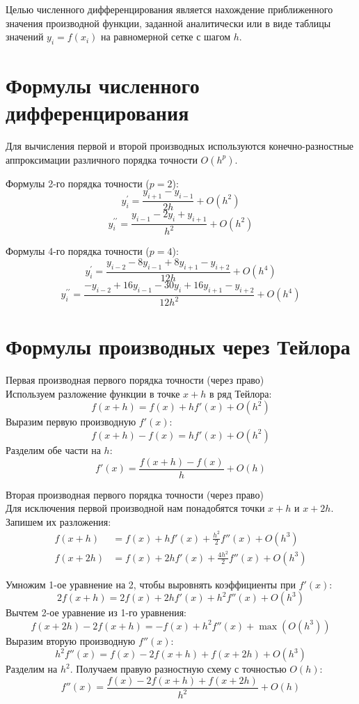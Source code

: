 \documentclass[a4paper]{article}
\begin{document}
Целью численного дифференцирования является нахождение приближенного значения производной функции, заданной аналитически или в виде таблицы значений $y_i = f(x_i)$ на равномерной сетке с шагом $h$.

\section*{\fontsize{11pt}{0pt}\selectfont\textbf{Формулы численного дифференцирования}}

Для вычисления первой и второй производных используются конечно-разностные аппроксимации различного порядка точности $O(h^p)$.

Формулы 2-го порядка точности ($p=2$):
\[
y_{i}^{\prime} = \frac{y_{i+1} - y_{i-1}}{2h} + O(h^2)
\]
\[
y_{i}^{\prime\prime} = \frac{y_{i-1} - 2y_i + y_{i+1}}{h^2} + O(h^2)
\]

Формулы 4-го порядка точности ($p=4$):
\[
y_{i}^{\prime} = \frac{y_{i-2} - 8y_{i-1} + 8y_{i+1} - y_{i+2}}{12h} + O(h^4)
\]
\[
y_{i}^{\prime\prime} = \frac{-y_{i-2} + 16y_{i-1} - 30y_i + 16y_{i+1} - y_{i+2}}{12h^2} + O(h^4)
\]

\section*{\fontsize{11pt}{0pt}\selectfont\textbf{Формулы производных через Тейлора}}

Первая производная первого порядка точности (через право)\\
Используем разложение функции в точке $x+h$ в ряд Тейлора:
\[
f(x+h) = f(x) + hf'(x) + O(h^2)
\]
Выразим первую производную $f'(x)$:
\[
f(x+h) - f(x) = hf'(x) + O(h^2)
\]
Разделим обе части на $h$:
\[
f'(x) = \frac{f(x+h) - f(x)}{h} + O(h)
\]

Вторая производная первого порядка точности (через право)\\
Для исключения первой производной нам понадобятся точки $x+h$ и $x+2h$. Запишем их разложения:
\begin{align}
f(x+h)  &= f(x) + hf'(x) + \frac{h^2}{2}f''(x) + O(h^3) \\
f(x+2h) &= f(x) + 2hf'(x) + \frac{4h^2}{2}f''(x) + O(h^3)
\end{align}

Умножим 1-ое уравнение на 2, чтобы выровнять коэффициенты при $f'(x)$:
\[
2f(x+h) = 2f(x) + 2hf'(x) + h^2f''(x) + O(h^3)
\]
Вычтем 2-ое уравнение из 1-го уравнения:
\[
f(x+2h) - 2f(x+h) = -f(x) + h^2f''(x) + \max(O(h^3))
\]
Выразим вторую производную $f''(x)$:
\[
h^2f''(x) = f(x) - 2f(x+h) + f(x+2h) + O(h^3)
\]
Разделим на $h^2$. Получаем правую разностную схему с точностью $O(h)$:
\[
f''(x) = \frac{f(x) - 2f(x+h) + f(x+2h)}{h^2} + O(h)
\]
\end{document}
